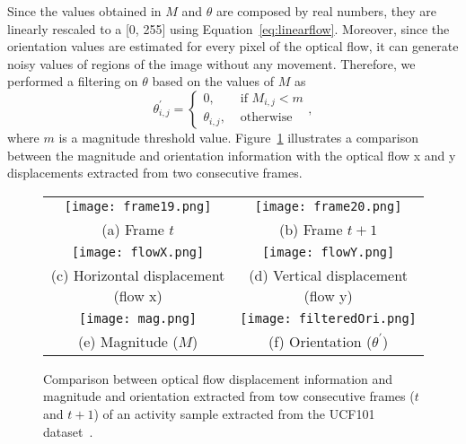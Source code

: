 \documentclass[10pt,conference]{IEEEtran}
\begin{document}
Since the values obtained in $M$ and $\theta$ are composed by real numbers, they are linearly rescaled to a [0, 255] using  Equation~\ref{eq:linearflow}. Moreover, since the orientation values are estimated for every pixel of the optical flow, it can generate noisy values of regions of the image without any movement. Therefore, we performed a filtering on $\theta$ based on the values of $M$ as 
\begin{equation}\label{eq:orifilter}
	\theta^{'}_{i,j} = \left\{
	\begin{array}{rl}
		0, &\mbox{ if $M_{i,j} < m$} \\
		\theta_{i,j}, &\mbox{ otherwise }
	\end{array} \right.,
\end{equation}
\noindent where $m$ is a magnitude threshold value. Figure~\ref{img:orimag} illustrates a comparison between the magnitude and orientation information with the optical flow x and y displacements extracted from two consecutive frames.

\begin{figure}[!t]
	\centering
	\begin{tabular}{cc}
		\texttt{[image: frame19.png]} & \texttt{[image: frame20.png]} \\
		\footnotesize{(a) Frame $t$} & \footnotesize{(b) Frame $t+1$} \\
		\texttt{[image: flowX.png]} & \texttt{[image: flowY.png]} \\
		\footnotesize{(c) Horizontal displacement (flow x)} & \footnotesize{(d) Vertical displacement (flow y)} \\
		\texttt{[image: mag.png]} & \texttt{[image: filteredOri.png]} \\
		\footnotesize{(e) Magnitude ($M$)} & \footnotesize{(f) Orientation ($\theta^{'}$)} \\
	\end{tabular}
	\caption{Comparison between optical flow displacement information and magnitude and orientation extracted from tow consecutive frames ($t$ and $t+1$) of an activity sample extracted from the UCF101 dataset~\cite{Soomro:2012}.}
	\label{img:orimag}
\end{figure}
\end{document}
